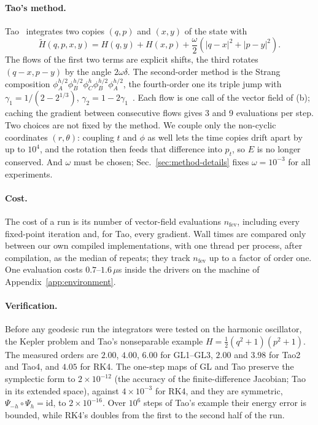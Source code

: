 \paragraph{Tao's method.} Tao~\cite{tao2016} integrates two copies $(q, p)$ and $(x, y)$ of the
state with
\begin{equation}
  \tilde H(q, p, x, y) = H(q, y) + H(x, p) + \frac{\omega}{2}\left(|q - x|^2 + |p - y|^2\right).
  \label{eq:tao}
\end{equation}
The flows of the first two terms are explicit shifts, the third rotates $(q - x, p - y)$ by the
angle $2\omega\delta$. The second-order method is the Strang composition
$\phi_A^{h/2}\phi_B^{h/2}\phi_C^{h}\phi_B^{h/2}\phi_A^{h/2}$, the fourth-order one its triple
jump with $\gamma_1 = 1/(2 - 2^{1/3})$, $\gamma_2 = 1 - 2\gamma_1$~\cite{yoshida1990}. Each flow
is one call of the vector field of (b); caching the gradient between consecutive flows gives 3
and 9 evaluations per step. Two choices are not fixed by the method. We couple only the
non-cyclic coordinates $(r, \theta)$: coupling $t$ and $\phi$ as well lets the time copies
drift apart by up to $10^4$, and the rotation then feeds that difference into $p_t$, so $E$ is
no longer conserved. And $\omega$ must be chosen; Sec.~\ref{sec:method-details} fixes
$\omega = 10^{-3}$ for all experiments.

\paragraph{Cost.} The cost of a run is its number of vector-field evaluations $n_\mathrm{fev}$,
including every fixed-point iteration and, for Tao, every gradient. Wall times are compared
only between our own compiled implementations, with one thread per process, after
compilation, as the median of repeats; they track $n_\mathrm{fev}$ up to a factor of order
one. One evaluation costs $0.7$--$1.6\,\mu$s inside the drivers on the machine of
Appendix~\ref{app:environment}.

\paragraph{Verification.} Before any geodesic run the integrators were tested on the harmonic
oscillator, the Kepler problem and Tao's nonseparable example $H = \tfrac12(q^2 + 1)(p^2 + 1)$.
The measured orders are $2.00$, $4.00$, $6.00$ for GL1--GL3, $2.00$ and $3.98$ for Tao2 and
Tao4, and $4.05$ for RK4. The one-step maps of GL and Tao preserve the symplectic form to
$2\times10^{-12}$ (the accuracy of the finite-difference Jacobian; Tao in its extended space),
against $4\times10^{-3}$ for RK4, and they are symmetric, $\Psi_{-h}\circ\Psi_h = \mathrm{id}$,
to $2\times10^{-16}$. Over $10^6$ steps of Tao's example their energy error is bounded, while
RK4's doubles from the first to the second half of the run.
